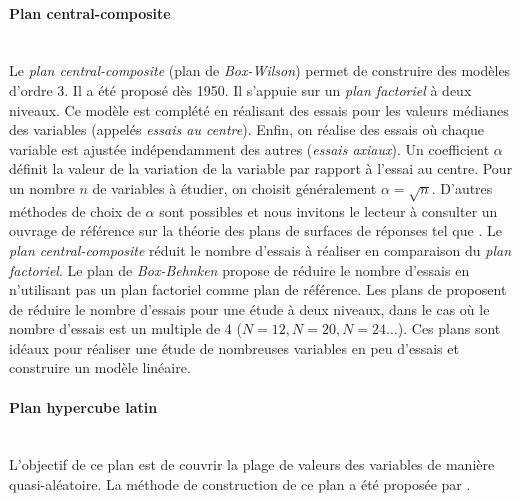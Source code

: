 \paragraph{Plan central-composite}\mbox{\label{parag:doe_cc}} \\
Le \textit{plan central-composite} (plan de \textit{Box-Wilson}) permet de construire des modèles d'ordre 3.
Il a été proposé dès 1950.
Il s'appuie sur un \textit{plan factoriel} à deux niveaux.
Ce modèle est complété en réalisant des essais pour les valeurs médianes des variables (appelés \textit{essais au centre}).
Enfin, on réalise des essais où chaque variable est ajustée indépendamment des autres (\textit{essais axiaux}).
Un coefficient $\alpha$ définit la valeur de la variation de la variable par rapport à l'essai au centre.
Pour un nombre $n$ de variables à étudier, on choisit généralement $\alpha = \sqrt{n}$.
D'autres méthodes de choix de $\alpha$ sont possibles et nous invitons le lecteur à consulter un ouvrage de référence sur la théorie des plans de surfaces de réponses tel que  \cite{myers_response_1971}.
Le \textit{plan central-composite} réduit le nombre d'essais à réaliser en comparaison du \textit{plan factoriel}.
Le plan de \textit{Box-Behnken} propose de réduire le nombre d'essais en n'utilisant pas un plan factoriel comme plan de référence.
Les plans de \citeauthor{plackett_design_1946} \cite{plackett_design_1946} proposent de réduire le nombre d'essais pour une étude à deux niveaux, dans le cas où le nombre d'essais est un multiple de 4 ($N=12, N=20, N=24 \dots$).
Ces plans sont idéaux pour réaliser une étude de nombreuses variables en peu d'essais et construire un modèle linéaire.

\paragraph{Plan hypercube latin}\mbox{\label{parag:doe_lhs}} \\
L'objectif de ce plan est de couvrir la plage de valeurs des variables de manière quasi-aléatoire.
La méthode de construction de ce plan a été proposée par \citeauthor{mckay_comparison_1979} \cite{mckay_comparison_1979}. %

